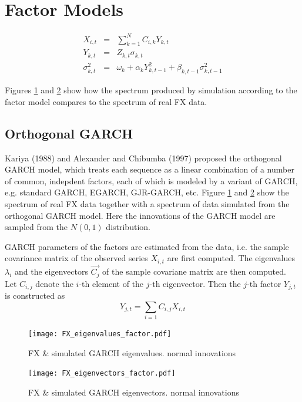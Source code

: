 \documentclass{article}
\begin{document}
\section{Factor Models}
\begin{eqnarray*}
  X_{i,t} &=& \sum_{k=1}^N C_{i,k} Y_{k,t} \\
  Y_{k,t} &=& Z_{k,t} \sigma_{k,t} \\
  \sigma_{k,t}^2 &=& \omega_k + \alpha_k Y_{k, t-1}^2 +
  \beta_{k, t-1} \sigma_{k, t-1}^2
\end{eqnarray*}

Figures \ref{fig:FX_eigenvalues_factor} and
\ref{fig:FX_eigenvectors_factor} show how the spectrum produced by
simulation according to the factor model compares to the spectrum
of real FX data.

\subsection{Orthogonal GARCH}
Kariya (1988) and Alexander and Chibumba (1997) proposed the
orthogonal GARCH model, which treats each sequence as a linear
combination of a number of common, indepdent factors, each of which
is modeled by a variant of GARCH, e.g. standard GARCH,
EGARCH, GJR-GARCH, etc. Figure \ref{fig:FX_eigenvalues_factor} and
\ref{fig:FX_eigenvectors_factor} show the spectrum of real FX data
together with a spectrum of data simulated from the orthogonal GARCH
model. Here the innovations of the GARCH model are sampled from the
$N(0, 1)$ distribution.

GARCH parameters of the factors are estimated from the data, i.e. the
sample covariance matrix of the observed series $X_{i,t}$ are first
computed. The eigenvalues $\lambda_i$ and the eigenvectors $\vec{C_j}$
of the sample covariane matrix are then computed. Let $C_{i,j}$
denote the $i$-th element of the $j$-th eigenvector. Then the $j$-th
factor $Y_{j,t}$ is constructed as
\[
Y_{j,t} = \sum_{i=1} C_{i, j} X_{i, t}
\]
\begin{figure}[htb!]
  \centering
  \texttt{[image: FX\_eigenvalues\_factor.pdf]}  
  \caption{FX \& simulated GARCH eigenvalues. normal innovations}
  \label{fig:FX_eigenvalues_factor}
\end{figure}

\begin{figure}[htb!]
  \centering
  \texttt{[image: FX\_eigenvectors\_factor.pdf]}  
  \caption{FX \& simulated GARCH eigenvectors. normal innovations}
  \label{fig:FX_eigenvectors_factor}
\end{figure}
\end{document}
